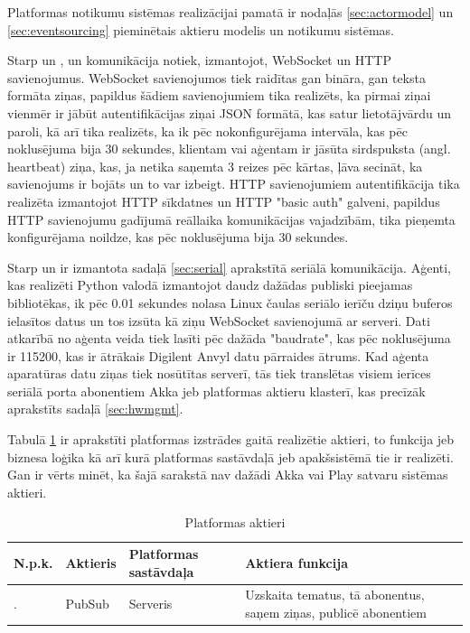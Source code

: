 Platformas notikumu sistēmas realizācijai pamatā ir nodaļās \ref{sec:actormodel}
un \ref{sec:eventsourcing} pieminētais aktieru modelis un notikumu sistēmas.

Starp  un , un
 komunikācija notiek, izmantojot, WebSocket un HTTP
savienojumus. WebSocket savienojumos tiek raidītas gan bināra, gan teksta
formāta ziņas, papildus šādiem savienojumiem tika realizēts, ka pirmai ziņai
vienmēr ir jābūt autentifikācijas ziņai JSON formātā, kas satur lietotājvārdu un
paroli, kā arī tika realizēts, ka ik pēc nokonfigurējama intervāla, kas pēc
noklusējuma bija 30 sekundes, klientam vai aģentam ir jāsūta sirdspuksta (angl.
heartbeat) ziņa, kas, ja netika saņemta 3 reizes pēc kārtas, ļāva secināt, ka
savienojums ir bojāts un to var izbeigt. HTTP savienojumiem autentifikācija tika
realizēta izmantojot HTTP sīkdatnes un HTTP "basic auth" galveni, papildus HTTP
savienojumu gadījumā reāllaika komunikācijas vajadzībām, tika pieņemta
konfigurējama noildze, kas pēc noklusējuma bija 30 sekundes.

Starp  un  ir izmantota sadaļā
\ref{sec:serial} aprakstītā seriālā komunikācija. Aģenti, kas realizēti Python
valodā izmantojot daudz dažādas publiski pieejamas bibliotēkas, ik pēc 0.01
sekundes nolasa Linux čaulas seriālo ierīču dziņu buferos ielasītos datus un tos
izsūta kā ziņu WebSocket savienojumā ar serveri. Dati atkarībā no aģenta veida
tiek lasīti pēc dažāda "baudrate", kas pēc noklusējuma ir 115200, kas ir
ātrākais Digilent Anvyl datu pārraides ātrums. Kad aģenta aparatūras datu ziņas
tiek nosūtītas serverī, tās tiek translētas visiem ierīces seriālā porta
abonentiem Akka jeb platformas aktieru klasterī, kas precīzāk aprakstīts sadaļā
\ref{sec:hwmgmt}.

Tabulā \ref{table:actors} ir aprakstīti platformas izstrādes gaitā realizētie
aktieri, to funkcija jeb biznesa loģika kā arī kurā platformas sastāvdaļā jeb
apakšsistēmā tie ir realizēti. Gan ir vērts minēt, ka šajā sarakstā nav dažādi
Akka vai Play satvaru sistēmas aktieri.

\begin{table}[H]
    \newcommand\rownumber{\stepcounter{actorcounter}\arabic{actorcounter}.}
    \begin{tabular}{ |p{1cm}|p{3cm}|p{2cm}|p{8cm}| }
    \hline
    N.p.k.&Aktieris&Platformas sastāvdaļa&Aktiera funkcija \\
    \hline
    \rownumber & PubSub & Serveris & Uzskaita tematus, tā abonentus, saņem ziņas, publicē abonentiem \\
    \hline
    \end{tabular}
    \centering
    \captionsetup{justification=centering}
    \caption{Platformas aktieri}
    \label{table:actors}
\end{table}

